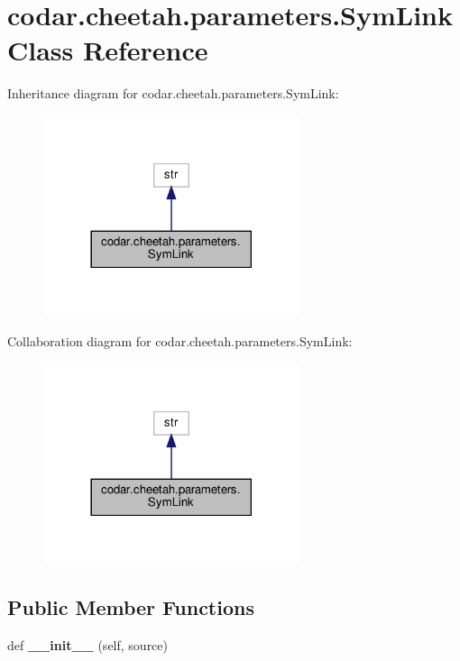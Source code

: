 \hypertarget{classcodar_1_1cheetah_1_1parameters_1_1_sym_link}{}\section{codar.\+cheetah.\+parameters.\+Sym\+Link Class Reference}
\label{classcodar_1_1cheetah_1_1parameters_1_1_sym_link}


Inheritance diagram for codar.\+cheetah.\+parameters.\+Sym\+Link\+:
\nopagebreak
\begin{figure}[H]
\begin{center}
\leavevmode
\includegraphics[width=213pt]{classcodar_1_1cheetah_1_1parameters_1_1_sym_link__inherit__graph}
\end{center}
\end{figure}


Collaboration diagram for codar.\+cheetah.\+parameters.\+Sym\+Link\+:
\nopagebreak
\begin{figure}[H]
\begin{center}
\leavevmode
\includegraphics[width=213pt]{classcodar_1_1cheetah_1_1parameters_1_1_sym_link__coll__graph}
\end{center}
\end{figure}
\subsection*{Public Member Functions}
\begin{DoxyCompactItemize}
\item 
\mbox{\label{classcodar_1_1cheetah_1_1parameters_1_1_sym_link_a5be8b2828b71e39b667a275b1668bc58}} 
def {\bfseries \+\_\+\+\_\+init\+\_\+\+\_\+} (self, source)
\end{DoxyCompactItemize}
